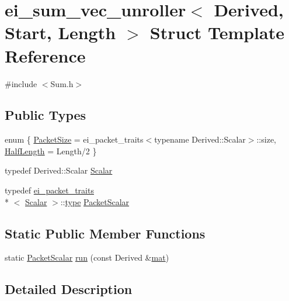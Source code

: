 \hypertarget{structei__sum__vec__unroller}{\section{ei\-\_\-sum\-\_\-vec\-\_\-unroller$<$ Derived, Start, Length $>$ Struct Template Reference}
\label{structei__sum__vec__unroller}
}


{\ttfamily \#include $<$Sum.\-h$>$}

\subsection*{Public Types}
\begin{DoxyCompactItemize}
\item 
enum \{ \hyperlink{structei__sum__vec__unroller_a0efe9f17aae57dcaa23a18d843860258ab71f3bd5a71327cfbca948a7e4f5aa73}{Packet\-Size} = ei\-\_\-packet\-\_\-traits$<$typename Derived\-:\-:Scalar$>$\-:\-:size, 
\hyperlink{structei__sum__vec__unroller_a0efe9f17aae57dcaa23a18d843860258a67fb7d98e63030ca97599e607fad7ef3}{Half\-Length} = Length/2
 \}
\item 
typedef Derived\-::\-Scalar \hyperlink{structei__sum__vec__unroller_a50f5b978ee253c4fce0eb589190590e8}{Scalar}
\item 
typedef \hyperlink{structei__packet__traits}{ei\-\_\-packet\-\_\-traits}\\*
$<$ \hyperlink{structei__sum__vec__unroller_a50f5b978ee253c4fce0eb589190590e8}{Scalar} $>$\-::\hyperlink{glext_8h_a7d05960f4f1c1b11f3177dc963a45d86}{type} \hyperlink{structei__sum__vec__unroller_a27ccb05e1f469ad400ab851e2a361a94}{Packet\-Scalar}
\end{DoxyCompactItemize}
\subsection*{Static Public Member Functions}
\begin{DoxyCompactItemize}
\item 
static \hyperlink{structei__sum__vec__unroller_a27ccb05e1f469ad400ab851e2a361a94}{Packet\-Scalar} \hyperlink{structei__sum__vec__unroller_ac06af9a3822000a81b710e867e6333eb}{run} (const Derived \&\hyperlink{uavobjecttemplate_8m_a16a51e808b16c46bbfd36da2e37cd123}{mat})
\end{DoxyCompactItemize}


\subsection{Detailed Description}
